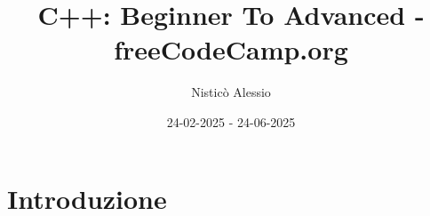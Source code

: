 \documentclass [twoside] {report}
\begin{document}
\author{Nisticò Alessio}
\title{C++: Beginner To Advanced - freeCodeCamp.org}
\date{24-02-2025 - 24-06-2025}
\maketitle

\tableofcontents 			%

\chapter{Introduzione}
\end{document}
